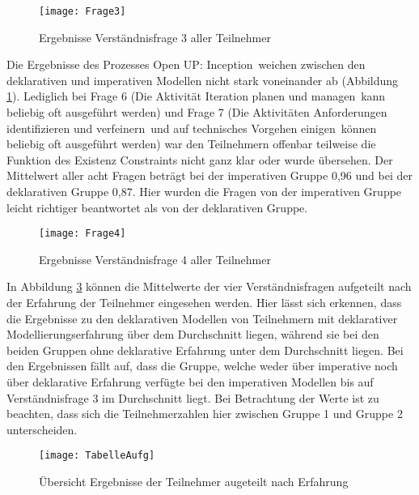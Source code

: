 \begin{figure}[htp]
\begin{center}
  \texttt{[image: Frage3]} %
  \caption{Ergebnisse Verständnisfrage 3 aller Teilnehmer}
  \label{fig:Frage3}
\end{center}
\end{figure}

Die Ergebnisse des Prozesses \grqq Open UP: Inception\grqq \ weichen zwischen den deklarativen und imperativen Modellen nicht stark voneinander ab (Abbildung \ref{fig:Frage3}). \newline
Lediglich bei Frage 6 (\grqq Die Aktivität \grqq Iteration planen und managen\grqq \ kann beliebig oft ausgeführt werden\grqq) und Frage 7 (\grqq Die Aktivitäten \grqq Anforderungen identifizieren und verfeinern\grqq \ und \grqq auf technisches Vorgehen einigen\grqq \ können beliebig oft ausgeführt werden) war den Teilnehmern offenbar teilweise die Funktion des Existenz Constraints nicht ganz klar oder wurde übersehen.\newline
Der Mittelwert aller acht Fragen beträgt bei der imperativen Gruppe 0,96 und bei der deklarativen Gruppe 0,87. Hier wurden die Fragen von der imperativen Gruppe leicht richtiger beantwortet als von der deklarativen Gruppe. \newline


\begin{figure}[htp]
\begin{center}
  \texttt{[image: Frage4]} %
  \caption{Ergebnisse Verständnisfrage 4 aller Teilnehmer}
  \label{fig:Frage4}
\end{center}
\end{figure}

In Abbildung \ref{fig:TabelleAufg} können die Mittelwerte der vier Verständnisfragen aufgeteilt nach der Erfahrung der Teilnehmer eingesehen werden. Hier lässt sich erkennen, dass die Ergebnisse zu den deklarativen Modellen von Teilnehmern mit deklarativer Modellierungserfahrung über dem Durchschnitt liegen, während sie bei den beiden Gruppen ohne deklarative Erfahrung unter dem Durchschnitt liegen. \newline
Bei den Ergebnissen fällt auf, dass die Gruppe, welche weder über imperative noch über deklarative Erfahrung verfügte bei den imperativen Modellen bis auf Verständnisfrage 3 im Durchschnitt liegt. Bei Betrachtung der Werte ist zu beachten, dass sich die Teilnehmerzahlen hier zwischen Gruppe 1 und Gruppe 2 unterscheiden.\newline
\begin{figure}[htp]
\begin{center}
  \texttt{[image: TabelleAufg]} %
  \caption{Übersicht Ergebnisse der Teilnehmer augeteilt nach Erfahrung}
  \label{fig:TabelleAufg}
\end{center}
\end{figure}




